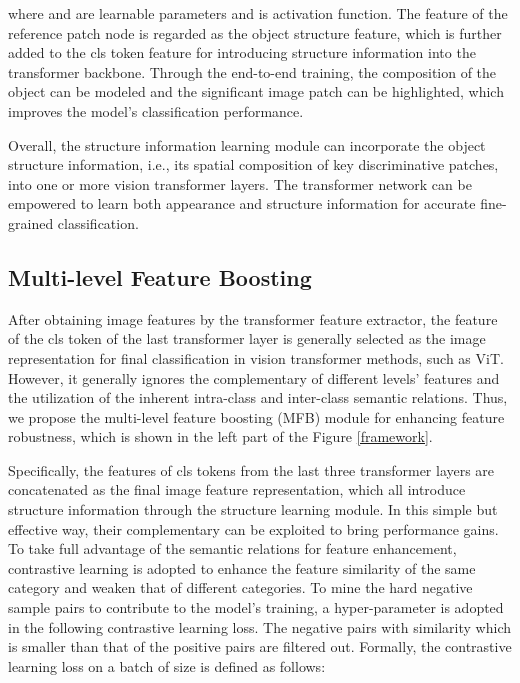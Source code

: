 \documentclass[sigconf, nonacm]{acmart}
\begin{document}
where  and  are learnable parameters and  is activation function. The feature of the reference patch node is regarded as the object structure feature, which is further added to the cls token feature for introducing structure information into the transformer backbone. Through the end-to-end training, the composition of the object can be modeled and the significant image patch can be highlighted, which improves the model’s classification performance.

Overall, the structure information learning module can incorporate the object structure information, i.e., its spatial composition of key discriminative patches, into one or more vision transformer layers. The transformer network can be empowered to learn both appearance and structure information for accurate fine-grained classification.

\subsection{Multi-level Feature Boosting}\label{MFB}

After obtaining image features by the transformer feature extractor, the feature of the cls token  of the last transformer layer is generally selected as the image representation for final classification in vision transformer methods, such as ViT. However, it generally ignores the complementary of different levels’ features and the utilization of the inherent intra-class and inter-class semantic relations. Thus, we propose the multi-level feature boosting (MFB) module for enhancing feature robustness, which is shown in the left part of the Figure \ref{framework}.

Specifically, the features of cls tokens from the last three transformer layers are concatenated as the final image feature representation, which all introduce structure information through the structure learning module. In this simple but effective way, their complementary can be exploited to bring performance gains. To take full advantage of the semantic relations for feature enhancement, contrastive learning is adopted to enhance the feature similarity of the same category and weaken that of different categories. To mine the hard negative sample pairs to contribute to the model’s training, a hyper-parameter  is adopted in the following contrastive learning loss. The negative pairs with similarity which is  smaller than that of the positive pairs are filtered out. Formally, the contrastive learning loss on a batch of size  is defined as follows:
\end{document}
